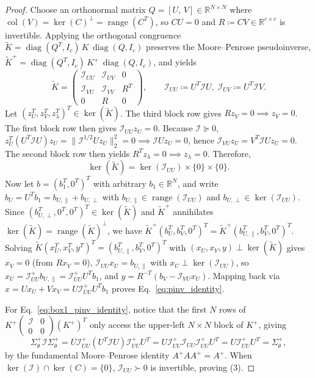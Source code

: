 \documentclass[11pt,a4paper]{article}
\theoremstyle{plain}
\theoremstyle{definition}
\theoremstyle{remark}
\newcommand{\R}{\mathbb{R}}
\newcommand{\cI}{\mathcal{I}}
\newcommand{\diag}{\operatorname{diag}}
\newcommand{\range}{\operatorname{range}}
\newcommand{\pinv}{^{+}}
\begin{document}
\begin{proof}
Choose an orthonormal matrix $Q = [U,\, V] \in \R^{N \times N}$ where $\operatorname{col}(V) = \ker(C)^\perp = \range(C^T)$, so $CU = 0$ and $R \coloneqq CV \in \R^{c \times c}$ is invertible. Applying the orthogonal congruence $\tilde{K} = \diag(Q^T, I_c)\, K \, \diag(Q, I_c)$ preserves the Moore--Penrose pseudoinverse, $\tilde{K}\pinv = \diag(Q^T, I_c)\, K\pinv \, \diag(Q, I_c)$, and yields
\[
\tilde{K} = \begin{pmatrix}
\cI_{UU} & \cI_{UV} & 0 \\
\cI_{VU} & \cI_{VV} & R^T \\
0 & R & 0
\end{pmatrix}, \qquad \cI_{UU} \coloneqq U^T \cI U,\; \cI_{UV} \coloneqq U^T \cI V.
\]
Let $(z_U^T, z_V^T, z_\lambda^T)^T \in \ker(\tilde{K})$. The third block row gives $R z_V = 0 \implies z_V = 0$. The first block row then gives $\cI_{UU} z_U = 0$. Because $\cI \succeq 0$, $z_U^T (U^T \cI U) z_U = \|\cI^{1/2} U z_U\|_2^2 = 0 \implies \cI U z_U = 0$, hence $\cI_{VU} z_U = V^T \cI U z_U = 0$. The second block row then yields $R^T z_\lambda = 0 \implies z_\lambda = 0$. Therefore,
\[
\ker(\tilde{K}) = \ker(\cI_{UU}) \times \{0\} \times \{0\}.
\]
Now let $b = (b_1^T, 0^T)^T$ with arbitrary $b_1 \in \R^N$, and write $b_U = U^T b_1 = b_{U,\parallel} + b_{U,\perp}$ with $b_{U,\parallel} \in \range(\cI_{UU})$ and $b_{U,\perp} \in \ker(\cI_{UU})$. Since $(b_{U,\perp}^T, 0^T, 0^T)^T \in \ker(\tilde{K})$ and $\tilde{K}\pinv$ annihilates $\ker(\tilde{K}) = \range(\tilde{K})^\perp$, we have $\tilde{K}\pinv (b_U^T, b_V^T, 0^T)^T = \tilde{K}\pinv (b_{U,\parallel}^T, b_V^T, 0^T)^T$. Solving $\tilde{K}(x_U^T, x_V^T, y^T)^T = (b_{U,\parallel}^T, b_V^T, 0^T)^T$ with $(x_U, x_V, y) \perp \ker(\tilde{K})$ gives $x_V = 0$ (from $R x_V = 0$), $\cI_{UU} x_U = b_{U,\parallel}$ with $x_U \perp \ker(\cI_{UU})$, so $x_U = \cI_{UU}\pinv b_{U,\parallel} = \cI_{UU}\pinv U^T b_1$, and $y = R^{-T}(b_V - \cI_{VU} x_U)$. Mapping back via $x = U x_U + V x_V = U \cI_{UU}\pinv U^T b_1$ proves Eq.~\eqref{eq:pinv_identity}.

For Eq.~\eqref{eq:box1_pinv_identity}, notice that the first $N$ rows of $K\pinv \begin{pmatrix} \cI & 0 \\ 0 & 0 \end{pmatrix} (K\pinv)^T$ only access the upper-left $N \times N$ block of $K\pinv$, giving
\[
\Sigma_\theta\pinv \cI \Sigma_\theta\pinv = U \cI_{UU}\pinv (U^T \cI U) \cI_{UU}\pinv U^T = U \cI_{UU}\pinv \cI_{UU} \cI_{UU}\pinv U^T = U \cI_{UU}\pinv U^T = \Sigma_\theta\pinv,
\]
by the fundamental Moore--Penrose identity $A\pinv A A\pinv = A\pinv$. When $\ker(\cI) \cap \ker(C) = \{0\}$, $\cI_{UU} \succ 0$ is invertible, proving (3).
\end{proof}
\end{document}
